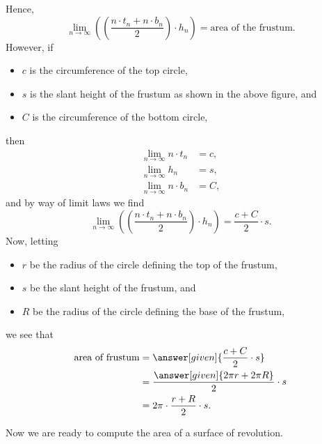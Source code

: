 \documentclass{ximera}
\begin{document}
\begin{theorem}
\begin{explanation}
\begin{image}
    \end{image}
    Hence,
    \[
    \lim_{n\to \infty} \left(\left(\frac{n\cdot t_{n}+n\cdot b_n}{2}\right)\cdot h_n\right) = \text{area of the frustum.}
    \]
    However, if
    \begin{itemize}
    \item $c$ is the circumference of the top circle,
    \item $s$ is the slant height of the frustum as shown in the above
      figure, and 
    \item $C$ is the circumference of the bottom circle,    
    \end{itemize}
    then
    \begin{align*}
      \lim_{n\to \infty} n \cdot t_{n}  &  =c,\\
      \lim_{n\to \infty} h_{n}  &  =s,\\
      \lim_{n\to \infty} n\cdot b_{n}  &  =C,
    \end{align*}
    and by way of limit laws we find
    \[
    \lim_{n\to \infty} \left(\left(\frac{n\cdot t_{n}+n\cdot b_n}{2}\right)\cdot h_n\right) = \frac{c + C}{2}\cdot s.
    \]
    Now, letting
    \begin{itemize}
    \item $r$ be the radius of the circle defining the top of the frustum,
    \item $s$ be the slant height of the frustum, and
    \item $R$ be the radius of the circle defining the base of the frustum,
    \end{itemize}
    we see that
    \begin{align*}
      \text{area of frustum}  &= \answer[given]{\frac{c + C}{2}\cdot s} \\
      &= \frac{\answer[given]{2\pi r + 2\pi R}}{2}\cdot s\\
      &=2\pi \cdot \frac{r+R}{2}\cdot s.
    \end{align*}
  \end{explanation}
\end{theorem}
Now we are ready to compute the area of a surface of revolution.
\end{document}
